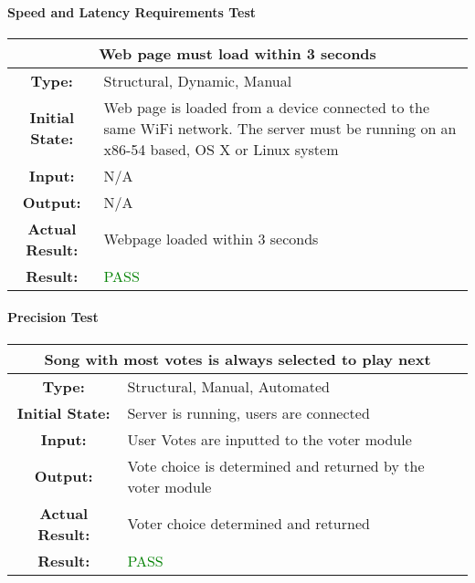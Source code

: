\documentclass[12pt, titlepage]{article}
\begin{document}
\paragraph{Speed and Latency Requirements Test}

\begin{center}
\begin{table}[H]
\begin{tabularx}{\textwidth}{| c X |}
\hline
\multicolumn{2}{|c|}{\textbf{Web page must load within 3 seconds}}\\
\hline
\textbf{Type: } & Structural, Dynamic, Manual\\
\textbf{Initial State: } & Web page is loaded from a device connected to the same WiFi network. The server must be running on an x86-54 based, OS X or Linux system\\
\textbf{Input: } & N/A\\
\textbf{Output: } & N/A \\
\textbf{Actual Result:  } & Webpage loaded within 3 seconds \\
\textbf{Result: } & \textcolor{green}{PASS}\\

\hline

\end{tabularx}
\end{table}
\end{center}

\paragraph{Precision Test}

\begin{center}
\begin{table}[H]
\begin{tabularx}{\textwidth}{| c X |}
\hline
\multicolumn{2}{|c|}{\textbf{Song with most votes is always selected to play next}}\\
\hline
\textbf{Type: } & Structural, Manual, Automated\\
\textbf{Initial State: } & Server is running, users are connected\\
\textbf{Input: } & User Votes are inputted to the voter module\\
\textbf{Output: } & Vote choice is determined and returned by the voter module \\
\textbf{Actual Result:  } & Voter choice determined and returned \\
\textbf{Result: } & \textcolor{green}{PASS}\\
\hline
\end{tabularx}
\end{table}
\end{center}
\end{document}
